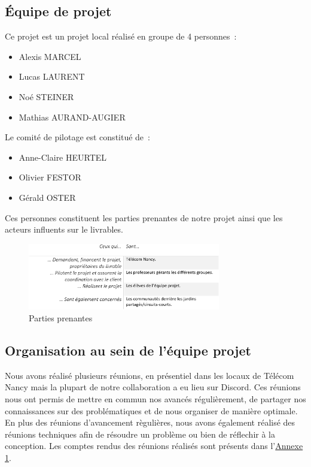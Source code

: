 \documentclass[french,a4paper]{article}
\begin{document}
\subsection{Équipe de projet}
Ce projet est un projet local réalisé en groupe de 4 personnes~:
\begin{itemize}
    \item Alexis MARCEL
    \item Lucas LAURENT
    \item Noé STEINER
    \item Mathias AURAND-AUGIER
\end{itemize}
Le comité de pilotage est constitué de~:
\begin{itemize}
    \item Anne-Claire HEURTEL
    \item Olivier FESTOR
    \item Gérald OSTER
\end{itemize}
Ces personnes constituent les parties prenantes de notre projet ainsi que les acteurs influents sur le livrables.
\begin{figure}[H]
    \centering
    \includegraphics[width=0.75\textwidth]{img/parties_prenantes.png}
    \caption{Parties prenantes}
\end{figure}
\subsection{Organisation au sein de l’équipe projet}
Nous avons réalisé plusieurs réunions, en présentiel dans les locaux de Télécom Nancy mais la plupart de notre collaboration a eu lieu sur Discord. Ces réunions nous ont permis de mettre en commun nos avancés régulièrement, de partager nos connaissances sur des problématiques et de nous organiser de manière optimale.
En plus des réunions d'avancement règulières, nous avons également réalisé des réunions techniques afin de résoudre un problème ou bien de réflechir à la conception.
Les comptes rendus des réunions réalisés sont présents dans l’\hyperlink{annexe1}{Annexe 1}.
\end{document}
